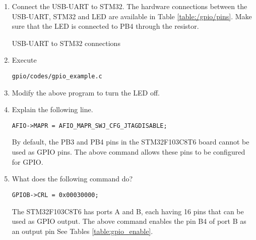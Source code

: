 \begin{enumerate}[label=\arabic*.,ref=\theenumi]
\item Connect the USB-UART to STM32.   The hardware connections between the USB-UART, STM32 and LED are available in Table \ref{table:/gpio/pins}. Make sure that the LED is connected to PB4 through the resistor.
\begin{table}[!ht]
\centering

\caption{USB-UART to STM32 connections}
\label{table:/gpio/pins}
\end{table}
%
\item Execute 
\begin{lstlisting}
gpio/codes/gpio_example.c
\end{lstlisting}
\item Modify the above program to turn the LED off.
\item Explain the following line.
\begin{lstlisting}
AFIO->MAPR = AFIO_MAPR_SWJ_CFG_JTAGDISABLE;
\end{lstlisting}
\solution By default, the PB3 and PB4 pins in the STM32F103C8T6 board cannot be used as GPIO pins.  The above
command allows these pins to be configured for GPIO.
\item What does the following command do?
\begin{lstlisting}
GPIOB->CRL = 0x00030000;	
\end{lstlisting}
\solution The STM32F103C8T6 has ports A and B, each  having 16 pins that can be used as GPIO output.  The above command enables the pin B4 of port B as an output pin
See Tables \ref{table:gpio_enable}.


\end{enumerate}

